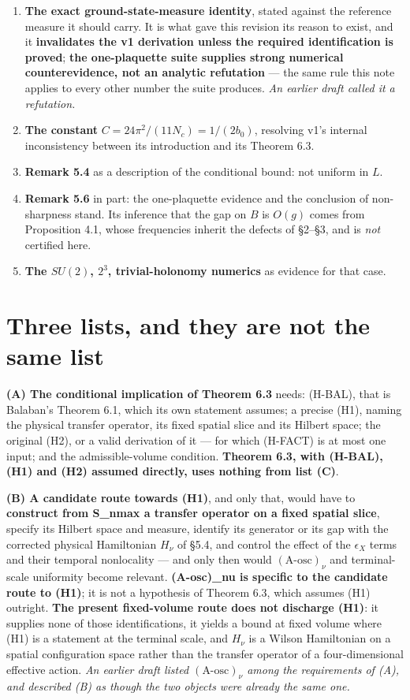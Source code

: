 \documentclass[11pt]{article}
\begin{document}
\begin{enumerate}
Qualitative only.
\item \textbf{The exact ground-state-measure identity}, stated against the reference
measure it should carry. It is what gave this revision its reason to exist, and it
\textbf{invalidates the v1 derivation unless the required identification is proved};
\textbf{the one-plaquette suite supplies strong numerical counterevidence, not an
analytic refutation} --- the same rule this note applies to every other number the
suite produces. \emph{An earlier draft called it a refutation.}
\item \textbf{The constant} $C=24\pi^2/(11N_c)=1/(2b_0)$, resolving v1's internal
inconsistency between its introduction and its Theorem 6.3.
\item \textbf{Remark 5.4} as a description of the conditional bound: not uniform in $L$.
\item \textbf{Remark 5.6} in part: the one-plaquette evidence and the conclusion of
non-sharpness stand. Its inference that the gap on $B$ is $O(g)$ comes from Proposition
4.1, whose frequencies inherit the defects of \S2--\S3, and is \emph{not} certified here.
\item \textbf{The $SU(2)$, $2^3$, trivial-holonomy numerics} as evidence for that case.
\end{enumerate}

\section{Three lists, and they are not the same list}

\textbf{(A) The conditional implication of Theorem 6.3} needs: (H-BAL), that is
Balaban's Theorem 6.1, which its own statement assumes; a precise (H1), naming the
physical transfer operator, its fixed spatial slice and its Hilbert space; the original
(H2), or a valid derivation of it --- for which (H-FACT) is at most one input; and the
admissible-volume condition. \textbf{Theorem 6.3, with (H-BAL), (H1) and (H2) assumed
directly, uses nothing from list (C)}.

\textbf{(B) A candidate route towards (H1)}, and only that, would have to
\textbf{construct from S\_nmax a transfer operator on a fixed spatial slice}, specify
its Hilbert space and measure, identify its generator or its gap with the corrected
physical Hamiltonian $H_\nu$ of \S5.4, and control the effect of the $\epsilon_X$ terms
and their temporal nonlocality --- and only then would $(\text{A-osc})_\nu$ and
terminal-scale uniformity become relevant. \textbf{(A-osc)\_nu is specific to the
candidate route to (H1)}; it is not a hypothesis of Theorem 6.3, which assumes (H1)
outright. \textbf{The present fixed-volume route does not discharge (H1)}: it supplies
none of those identifications, it yields a bound at fixed volume where (H1) is a
statement at the terminal scale, and $H_\nu$ is a Wilson Hamiltonian on a spatial
configuration space rather than the transfer operator of a four-dimensional effective
action. \emph{An earlier draft listed $(\text{A-osc})_\nu$ among the requirements of
(A), and described (B) as though the two objects were already the same one.}
\end{document}
